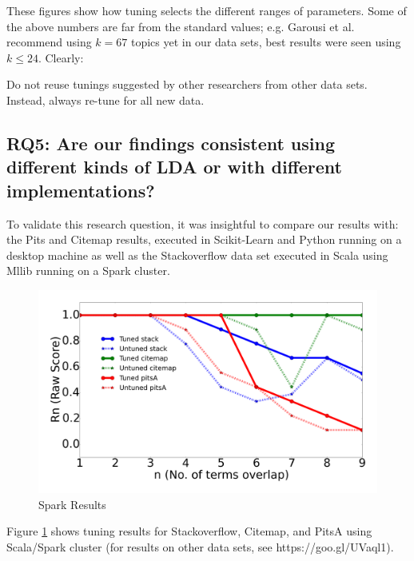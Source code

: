 \documentclass[twocolumn,5p,sort&compress]{elsarticle}
\theoremstyle{break}
\begin{document}
  These figures
show how tuning selects the different ranges  of
parameters. 
Some of the above numbers are far from the standard values; e.g. Garousi et al.~\cite{garousi2016citations} recommend using $k=67$ topics
yet in our data sets, best results were seen using $k \le 24$.
Clearly:

\begin{lesson}
  Do not  reuse tunings suggested by other researchers from other data sets.
  Instead, always re-tune for all new data.
\end{lesson}

\subsection{\textbf{RQ5}: \textbf{Are our findings consistent using different kinds of LDA or with different implementations?}}

To validate this research question, it was insightful to compare our results with: the Pits and Citemap results, executed in Scikit-Learn and Python running on a desktop machine as well as the Stackoverflow data set executed in Scala using Mllib running on a Spark cluster.

\begin{figure}[!b]
  \captionsetup{justification=centering}
  \includegraphics[width=\linewidth]{./fig/spark.png}
  \caption{Spark Results}
  \label{python_spark}
\end{figure}

Figure \ref{python_spark} shows tuning results for Stackoverflow, Citemap, and PitsA 
   using Scala/Spark cluster (for results on other data sets, see https://goo.gl/UVaql1).
   
\end{document}
